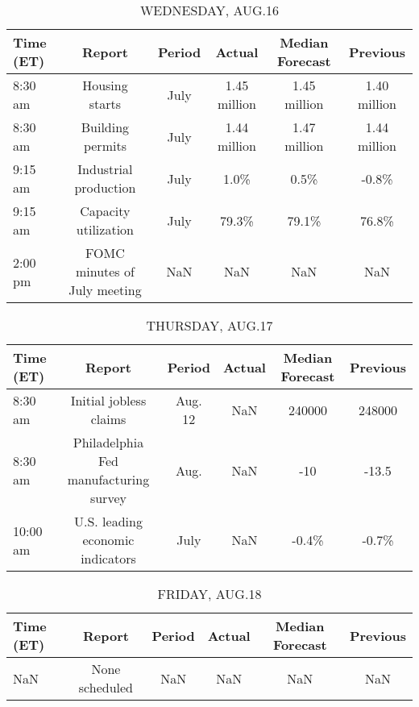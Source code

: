 \documentclass{article}%
\begin{document}
\begin{table}[htbp]%
\caption{WEDNESDAY, AUG.16}%
\centering%
\begin{adjustbox}{width=1\textwidth}%
\begin{tabular}{lccccc}
\toprule
Time (ET) &                       Report & Period &       Actual & Median Forecast &     Previous \\
\midrule
  8:30 am &               Housing starts &   July & 1.45 million &    1.45 million & 1.40 million \\
  8:30 am &             Building permits &   July & 1.44 million &    1.47 million & 1.44 million \\
  9:15 am &        Industrial production &   July &         1.0\% &            0.5\% &        -0.8\% \\
  9:15 am &         Capacity utilization &   July &        79.3\% &           79.1\% &        76.8\% \\
  2:00 pm & FOMC minutes of July meeting &    NaN &          NaN &             NaN &          NaN \\
\bottomrule
\end{tabular}
%
\end{adjustbox}%
\end{table}

%


\begin{table}[htbp]%
\caption{THURSDAY, AUG.17}%
\centering%
\begin{adjustbox}{width=1\textwidth}%
\begin{tabular}{lccccc}
\toprule
Time (ET) &                                Report &  Period & Actual & Median Forecast & Previous \\
\midrule
  8:30 am &                Initial jobless claims & Aug. 12 &    NaN &          240000 &   248000 \\
  8:30 am & Philadelphia Fed manufacturing survey &    Aug. &    NaN &             -10 &    -13.5 \\
 10:00 am &      U.S. leading economic indicators &    July &    NaN &           -0.4\% &    -0.7\% \\
\bottomrule
\end{tabular}
%
\end{adjustbox}%
\end{table}

%


\begin{table}[htbp]%
\caption{FRIDAY, AUG.18}%
\centering%
\begin{adjustbox}{width=1\textwidth}%
\begin{tabular}{lccccc}
\toprule
Time (ET) &         Report & Period & Actual & Median Forecast & Previous \\
\midrule
      NaN & None scheduled &    NaN &    NaN &             NaN &      NaN \\
\bottomrule
\end{tabular}
%
\end{adjustbox}%
\end{table}
\end{document}
